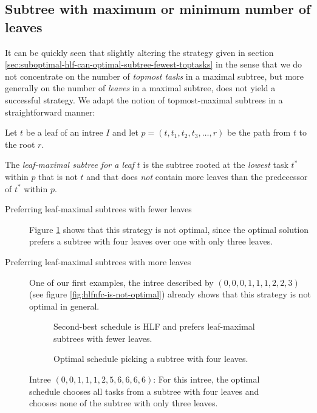 \subsection{Subtree with maximum or minimum number of leaves}
\label{sec:suboptimal-hlf-can-optimal-subtree-fewest-leaves}

It can be quickly seen that slightly altering the strategy given in section \ref{sec:suboptimal-hlf-can-optimal-subtree-fewest-toptasks} in the sense that we do not concentrate on the number of \emph{topmost tasks} in a maximal subtree, but more generally on the number of \emph{leaves} in a maximal subtree, does not yield a successful strategy. We adapt the notion of topmost-maximal subtrees in a straightforward manner:

\begin{definition}
  Let $t$ be a leaf of an intree $I$ and let $p=(t, t_1, t_2, t_3, \dots, r)$ be the path from $t$ to the root $r$.

  The \emph{leaf-maximal subtree for a leaf} $t$ is the subtree rooted at the \emph{lowest} task $t^*$ within $p$ that is not $t$ and that does \emph{not} contain more leaves than the predecessor of $t^*$ within $p$.
\end{definition}

\begin{description}
\item [Preferring leaf-maximal subtrees with fewer leaves] Figure \ref{fig:subtree-with-fewest-leaves-suboptimal} shows that this strategy is not optimal, since the optimal solution prefers a subtree with four leaves over one with only three leaves.
\item [Preferring leaf-maximal subtrees with more leaves] One of our first examples, the intree described by $(0,0,0,1,1,1,2,2,3)$ (see figure \ref{fig:hlfnfc-is-not-optimal}) already shows that this strategy is not optimal in general.
\end{description}

\begin{figure}[ht]
  \centering
  \begin{subfigure}{.45\textwidth}
    \centering
    
    \caption{Second-best schedule is HLF and prefers leaf-maximal subtrees with fewer leaves.}
  \end{subfigure}
  \quad
  \begin{subfigure}{.45\textwidth}
    \centering
    
    \caption{Optimal schedule picking a subtree with four leaves.}
  \end{subfigure}
\caption{Intree $(0, 0, 1, 1, 1, 2, 5, 6, 6, 6, 6)$: For this intree, the optimal schedule chooses all tasks from a subtree with four leaves and chooses none of the subtree with only three leaves.}
  \label{fig:subtree-with-fewest-leaves-suboptimal}
\end{figure}


